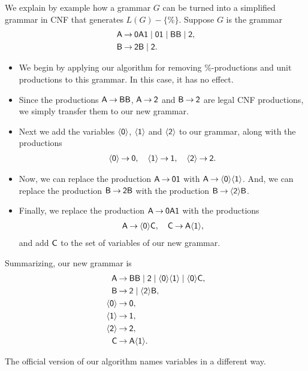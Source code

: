 We explain by example how a grammar $G$ can be turned into a
simplified grammar in CNF that generates $L(G)-\{\%\}$.
Suppose $G$ is the grammar
\begin{align*}
\mathsf{A} &\mathbin{\to} \mathsf{0A1} \mid \mathsf{01} \mid \mathsf{BB} \mid \mathsf{2} , \\
\mathsf{B} &\mathbin{\to} \mathsf{2B} \mid \mathsf{2} .
\end{align*}
\begin{itemize}
\item We begin by applying our algorithm for removing $\%$-productions
  and unit productions to this grammar.  In this case, it has no
  effect.

\item Since the productions $\mathsf{A}\mathbin{\to}\mathsf{BB}$, $\mathsf{A}\mathbin{\to}\mathsf{2}$
  and $\mathsf{B}\mathbin{\to}\mathsf{2}$ are legal CNF productions, we simply transfer
  them to our new grammar.

\item Next we add the variables $\langle\mathsf{0}\rangle$, $\langle\mathsf{1}\rangle$ and $\langle\mathsf{2}\rangle$ to our
  grammar, along with the productions
  \begin{gather*}
    \langle\mathsf{0}\rangle\mathbin{\to}\mathsf{0},\quad\langle\mathsf{1}\rangle\mathbin{\to}\mathsf{1},\quad\langle\mathsf{2}\rangle\mathbin{\to}\mathsf{2} .
  \end{gather*}

\item Now, we can replace the production $\mathsf{A}\mathbin{\to}\mathsf{01}$ with
  $\mathsf{A}\mathbin{\to}\langle\mathsf{0}\rangle\langle\mathsf{1}\rangle$.  And, we can replace the production
  $\mathsf{B}\mathbin{\to}\mathsf{2B}$ with the production $\mathsf{B}\mathbin{\to}\langle\mathsf{2}\rangle\mathsf{B}$.

\item Finally, we replace the production $\mathsf{A}\mathbin{\to}\mathsf{0A1}$ with
  the productions
  \begin{gather*}
    \mathsf{A}\mathbin{\to}\langle\mathsf{0}\rangle\mathsf{C},\quad\mathsf{C}\mathbin{\to}\mathsf{A}\langle\mathsf{1}\rangle ,
  \end{gather*}
  and add $\mathsf{C}$ to the set of variables of our new grammar.
\end{itemize}
Summarizing, our new grammar is
\begin{align*}
  \mathsf{A} &\mathbin{\to} \mathsf{BB} \mid \mathsf{2} \mid \langle\mathsf{0}\rangle\langle\mathsf{1}\rangle \mid
  \langle\mathsf{0}\rangle\mathsf{C} , \\
  \mathsf{B} &\mathbin{\to} \mathsf{2} \mid \langle\mathsf{2}\rangle\mathsf{B} , \\
  \langle\mathsf{0}\rangle &\mathbin{\to} \mathsf{0} , \\
  \langle\mathsf{1}\rangle &\mathbin{\to} \mathsf{1} , \\
  \langle\mathsf{2}\rangle &\mathbin{\to} \mathsf{2} , \\
  \mathsf{C} &\mathbin{\to} \mathsf{A}\langle\mathsf{1}\rangle .
\end{align*}

The official version of our algorithm names variables in a different
way.

